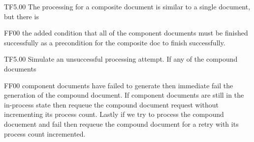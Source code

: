 %
%
%
%
%
%
%
%
\@pvspace{8.0pt}%
\begin{lcom}{2.5}%
\begin{cpar}{0}{T}{F}{5.0}{0}{}%
 The processing for a composite document is similar to a single document, but
 there is
\end{cpar}%
\begin{cpar}{1}{F}{F}{0}{0}{}%
 the added condition that all of the component documents must be finished
 successfully
 as a precondition for the composite doc to finish successfully.
\end{cpar}%
\end{lcom}%
%
%
%
%
%
%
%
%
%
\@pvspace{8.0pt}%
\@x{}%
%
\@xx{}%
%
%
%
%
%
%
\@pvspace{8.0pt}%
\begin{lcom}{2.5}%
\begin{cpar}{0}{T}{F}{5.0}{0}{}%
Simulate an unsuccessful processing attempt. If any of the compound documents
\end{cpar}%
\begin{cpar}{1}{F}{F}{0}{0}{}%
 component documents have failed to generate then immediate fail the
 generation of the
 compound document. If component documents are still in the in-process state
 then requeue
 the compound document request without incrementing its process count. Lastly
 if we try
 to process the compound docuement and fail then requeue the compound
 document for a retry
 with its process count incremented.
\end{cpar}%
\end{lcom}%
